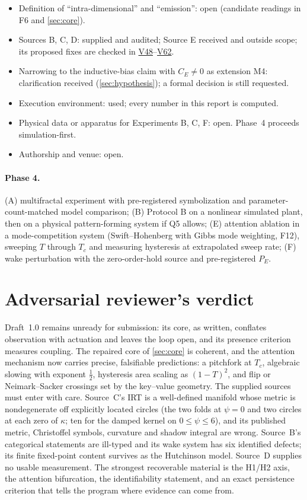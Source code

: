 \documentclass[11pt]{article}
\theoremstyle{definition}
\theoremstyle{remark}
\newcommand{\V}[1]{\hyperref[app:verify]{\textsf{#1}}}
\begin{document}
\begin{itemize}
\item[Q1] Definition of ``intra-dimensional'' and ``emission'': open (candidate readings in F6 and \cref{sec:core}).
\item[Q2] Sources B, C, D: supplied and audited; Source E received and outside scope; its proposed fixes are checked in \V{V48}--\V{V62}.
\item[Q3] Narrowing to the inductive-bias claim with $C_E\ne0$ as extension M4: clarification received (\cref{sec:hypothesis}); a formal decision is still requested.
\item[Q4] Execution environment: used; every number in this report is computed.
\item[Q5] Physical data or apparatus for Experiments B, C, F: open. Phase~4 proceeds simulation-first.
\item[Q6] Authorship and venue: open.
\end{itemize}
\paragraph{Phase 4.} (A) multifractal experiment with pre-registered symbolization and parameter-count-matched model comparison; (B) Protocol B on a nonlinear simulated plant, then on a physical pattern-forming system if Q5 allows; (E) attention ablation in a mode-competition system (Swift--Hohenberg with Gibbs mode weighting, F12), sweeping $T$ through $T_c$ and measuring hysteresis at extrapolated sweep rate; (F) wake perturbation with the zero-order-hold source and pre-registered $P_E$.

\section{Adversarial reviewer's verdict}

Draft~1.0 remains unready for submission: its core, as written, conflates observation with actuation and leaves the loop open, and its presence criterion measures coupling. The repaired core of \cref{sec:core} is coherent, and the attention mechanism now carries precise, falsifiable predictions: a pitchfork at $T_c$, algebraic slowing with exponent $\tfrac12$, hysteresis area scaling as $(1-T)^2$, and flip or Neimark--Sacker crossings set by the key--value geometry. The supplied sources must enter with care. Source~C's IRT is a well-defined manifold whose metric is nondegenerate off explicitly located circles (the two folds at $\psi=0$ and two circles at each zero of $\kappa$; ten for the damped kernel on $0\le\psi\le6$), and its published metric, Christoffel symbols, curvature and shadow integral are wrong. Source~B's categorical statements are ill-typed and its wake system has six identified defects; its finite fixed-point content survives as the Hutchinson model. Source~D supplies no usable measurement. The strongest recoverable material is the H1/H2 axis, the attention bifurcation, the identifiability statement, and an exact persistence criterion that tells the program where evidence can come from.
\end{document}
